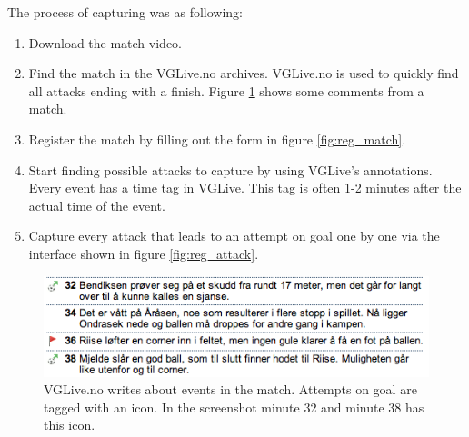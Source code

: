 The process of capturing was as following:
\begin{enumerate}
\item Download the match video.
\item Find the match in the VGLive.no archives. VGLive.no is used to quickly find all attacks ending with a finish. Figure \ref{fig:vglive} shows some comments from a match.
\item Register the match by filling out the form in figure \ref{fig:reg_match}.
\item Start finding possible attacks to capture by using VGLive's annotations. Every event has a time tag in VGLive. This tag is often 1-2 minutes after the actual time of the event. 
\item Capture every attack that leads to an attempt on goal one by one via the interface shown in figure \ref{fig:reg_attack}.
\end{enumerate}

\begin{figure}[ht!]
\centering
\includegraphics[width=1\textwidth]{images/demo/vglive}
\caption{VGLive.no writes about events in the match. Attempts on goal are tagged with an icon. In the screenshot minute 32 and minute 38 has this icon.}
\label{fig:vglive}
\end{figure}










